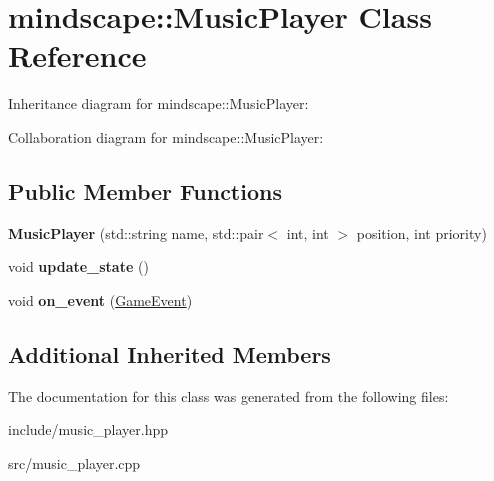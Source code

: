 \hypertarget{classmindscape_1_1_music_player}{}\section{mindscape\+:\+:Music\+Player Class Reference}
\label{classmindscape_1_1_music_player}


Inheritance diagram for mindscape\+:\+:Music\+Player\+:


Collaboration diagram for mindscape\+:\+:Music\+Player\+:
\subsection*{Public Member Functions}
\begin{DoxyCompactItemize}
\item 
{\bfseries Music\+Player} (std\+::string name, std\+::pair$<$ int, int $>$ position, int priority)\hypertarget{classmindscape_1_1_music_player_a98268fcd0769466ccabef1b386be9cac}{}\label{classmindscape_1_1_music_player_a98268fcd0769466ccabef1b386be9cac}

\item 
void {\bfseries update\+\_\+state} ()\hypertarget{classmindscape_1_1_music_player_a21aa157610534ba64c9f87f7836cb9d9}{}\label{classmindscape_1_1_music_player_a21aa157610534ba64c9f87f7836cb9d9}

\item 
void {\bfseries on\+\_\+event} (\hyperlink{class_game_event}{Game\+Event})\hypertarget{classmindscape_1_1_music_player_a865555fc70044d188a23ec2e9da94037}{}\label{classmindscape_1_1_music_player_a865555fc70044d188a23ec2e9da94037}

\end{DoxyCompactItemize}
\subsection*{Additional Inherited Members}


The documentation for this class was generated from the following files\+:\begin{DoxyCompactItemize}
\item 
include/music\+\_\+player.\+hpp\item 
src/music\+\_\+player.\+cpp\end{DoxyCompactItemize}
